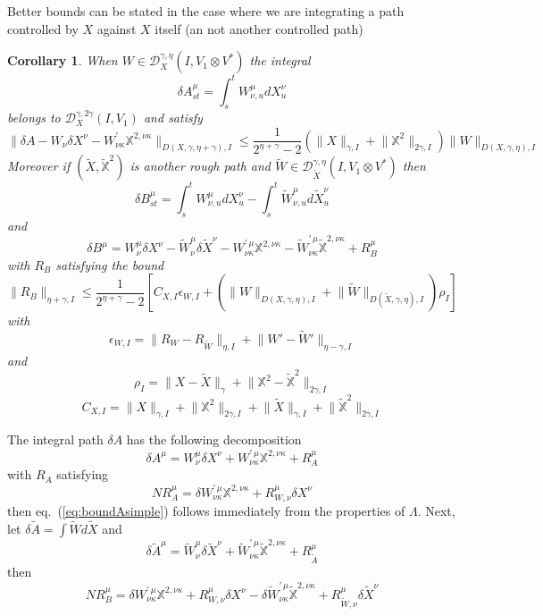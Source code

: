 \documentclass[a4paper,12pt,reqno]{amsproc}
\newcommand{\der}{\delta\!}
\newcommand{\NN}{N}
\newcommand{\DD}{\mathcal{D}}
\newcommand{\norm}[1]{\lVert #1\rVert}
\newcommand{\wt}{\widetilde}
\newtheorem{corollary}{Corollary}
\begin{document}
Better bounds can be stated in the case where we are integrating a
path controlled by $X$ against $X$ itself (an not another controlled path)
\begin{corollary}
\label{cor:betterbounds}
When $W \in \DD_X^{\gamma,\eta}(I,V_1 \otimes V^*)$ the integral
$$
\der A^\mu_{st} = \int_s^t W^\mu_{\nu,u} dX^\nu_u
$$  
belongs to $\DD_{X}^{\gamma,2\gamma}(I,V_1)$ and satisfy
\begin{equation}
\label{eq:boundAsimple}
\norm{\der A - W_\nu \der X^\nu - W^{\prime}_{\nu\kappa}
  \mathbb{X}^{2,\nu\kappa}}_{D(X,\gamma,\eta+\gamma),I} \le
\frac{1}{2^{\eta+\gamma}-2}
(\norm{X}_{\gamma,I}+\norm{\mathbb{X}^2}_{2\gamma,I}) \norm{W}_{D(X,\gamma,\eta),I}  
\end{equation}
Moreover if $(\wt X, \mathbb{\wt X}^2)$ is another rough path and $\wt
W \in \DD_{\wt X}^{\gamma,\eta}(I,V_1\otimes V^*)$ then
$$
\der B^\mu_{st} =  \int_s^t W^\mu_{\nu,u} dX^\nu_u -  \int_s^t \wt W^\mu_{\nu,u} d\wt X^\nu_u
$$
and
$$
\der B^\mu = W^\mu_\nu \der X^\nu - \wt W^\mu_\nu \der \wt X^\nu - W^{\prime\,\mu}_{\nu\kappa} \mathbb{ X}^{2,\nu\kappa} - \wt W^{\prime\,\mu}_{\nu\kappa}
\mathbb{ \wt X}^{2,\nu\kappa} + R^\mu_{B}
$$
with  $R_B$
satisfying the bound
\begin{equation}
\label{eq:betterbound-difference}
\norm{R_B}_{\eta+\gamma,I} \le \frac{1}{2^{\eta+\gamma}-2}\left[
C_{X,I} \epsilon_{W,I} +
(\norm{W}_{D(X,\gamma,\eta),I}+\norm{\wt
  W}_{D(\wt X,\gamma,\eta),I}) \rho_I \right]
\end{equation}
with
$$
\epsilon_{W,I} = \norm{ R_W - R_{\wt W}}_{\eta,I} + \norm{W'-\wt W'}_{\eta-\gamma,I}
$$
and
$$
\rho_I = \norm{X-\wt X}_{\gamma} + \norm{\mathbb{X}^2-\mathbb{\wt X}^2}_{2\gamma,I} 
$$
$$
C_{X,I} =
 \norm{X}_{\gamma,I}+\norm{\mathbb{X}^2}_{2\gamma,I}+
 \norm{\wt X}_{\gamma,I}+\norm{\mathbb{\wt X}^2}_{2\gamma,I} 
$$
\end{corollary}
\proof
The integral path $\der A$ has the following decomposition
$$
\der A^\mu = W^\mu_\nu \der X^\nu + W^{\prime\,\mu}_{\nu\kappa} \mathbb{X}^{2,\nu\kappa} + R^\mu_A
$$
with $R_A$ satisfying
$$
\NN R_A^\mu = \der W^{\prime\,\mu}_{\nu\kappa} \mathbb{X}^{2,\nu\kappa} + R^\mu_{W,\nu} \der X^\nu
$$
then eq.~(\ref{eq:boundAsimple}) follows immediately from the
properties of $\Lambda$. Next, let $\der \wt A = \int \wt W d \wt X$
and
$$
\der \wt A^\mu = \wt W^\mu_\nu \der \wt X^\nu + \wt
W^{\prime\,\mu}_{\nu\kappa} \mathbb{\wt X}^{2,\nu\kappa} + R^\mu_{\wt A}
$$
then
$$
\NN R^\mu_B = \der W^{\prime\,\mu}_{\nu\kappa} \mathbb{X}^{2,\nu\kappa} +
R^\mu_{W,\nu} \der X^\nu - \der \wt W^{\prime\,\mu}_{\nu\kappa}
\mathbb{\wt X}^{2,\nu\kappa} + R^\mu_{\wt W,\nu} \der \wt X^\nu
$$
\end{document}
